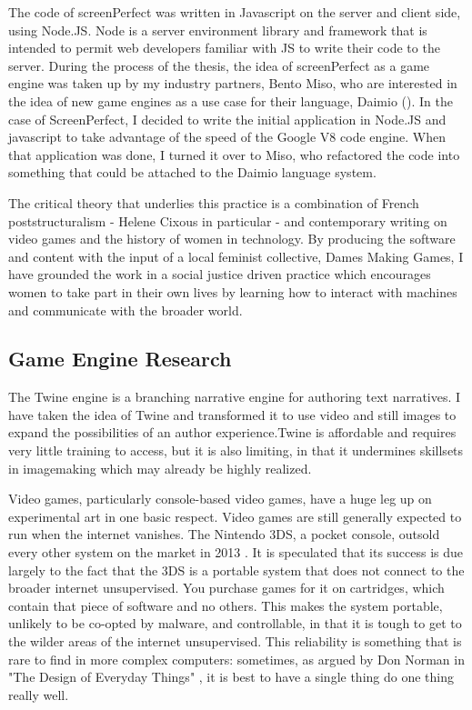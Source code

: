 The code of screenPerfect was written in Javascript on the server and client side, using Node.JS. Node is a server environment library and framework that is intended to permit web developers familiar with JS to write their code to the server. During the process of the thesis, the idea of screenPerfect as a game engine was taken up by my industry partners, Bento Miso, who are interested in the idea of new game engines as a use case for their language, Daimio (\cite{daimio}). In the case of ScreenPerfect, I decided to write the initial application in Node.JS and javascript to take advantage of the speed of the Google V8 code engine. When that application was done, I turned it over to Miso, who refactored the code into something that could be attached to the Daimio language system.

The critical theory that underlies this practice is a combination of French poststructuralism - Helene Cixous in particular - and contemporary writing on video games and the history of women in technology. By producing the software and content with the input of a local feminist collective, Dames Making Games, I have grounded the work in a social justice driven practice which encourages women to take part in their own lives by learning how to interact with machines and communicate with the broader world.

\subsection{Game Engine Research}

The Twine engine is a branching narrative engine for authoring text narratives. I have taken the idea of Twine and transformed it to use video and still images to expand the possibilities of an author experience.Twine is affordable and requires very little training to access, but it is also limiting, in that it undermines skillsets in imagemaking which may already be highly realized. 

Video games, particularly console-based video games, have a huge leg up on experimental art in one basic respect. Video games are still generally expected to run when the internet vanishes. The Nintendo 3DS, a pocket console, outsold every other system on the market in 2013 \cite{nintendosales}. It is speculated that its success is due largely to the fact that the 3DS is a portable system that does not connect to the broader internet unsupervised. You purchase games for it on cartridges, which contain that piece of software and no others. This makes the system portable, unlikely to be co-opted by malware, and controllable, in that it is tough to get to the wilder areas of the internet unsupervised. This reliability is something that is rare to find in more complex computers: sometimes, as argued by Don Norman in "The Design of Everyday Things" \cite{norman}, it is best to have a single thing do one thing really well. 

